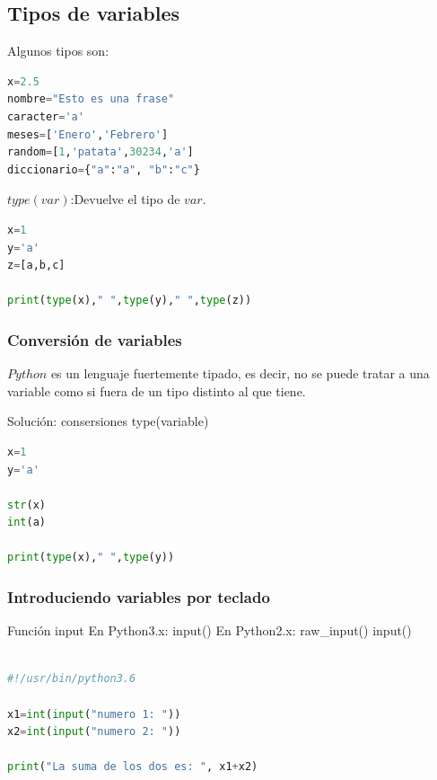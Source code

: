 \documentclass{beamer}
\begin{document}
\subsection{Tipos de variables}
\begin{frame}[fragile]
\begin{exampleblock}{}
Algunos tipos son:
\end{exampleblock}
\begin{lstlisting}[language=Python]
x=2.5
nombre="Esto es una frase"
caracter='a'
meses=['Enero','Febrero']
random=[1,'patata',30234,'a']
diccionario={"a":"a", "b":"c"}
\end{lstlisting}
\pause
\begin{exampleblock}{}
$type(var)$:Devuelve el tipo de $var$.
\end{exampleblock}

\begin{lstlisting}[language=Python]
x=1
y='a'
z=[a,b,c]

print(type(x)," ",type(y)," ",type(z))
\end{lstlisting}
\end{frame}

\begin{frame}[fragile]
\frametitle{Conversión de variables}
\begin{block}{}
$Python$ es un lenguaje fuertemente tipado, es decir, no se puede tratar a una variable como si fuera de un  tipo distinto al que tiene.
\end{block}
\pause
\begin{block}{Solución: consersiones}
type(variable)
\end{block}
\begin{lstlisting}[language=Python]
x=1
y='a'

str(x)
int(a)

print(type(x)," ",type(y))
\end{lstlisting}
\end{frame}

\begin{frame}[fragile]
\frametitle{Introduciendo variables por teclado}
\begin{block}{Función input}
En Python3.x: input()
En Python2.x: raw\_input() input()
\end{block}
\begin{lstlisting}[language=Python]

#!/usr/bin/python3.6

x1=int(input("numero 1: "))
x2=int(input("numero 2: "))

print("La suma de los dos es: ", x1+x2)
\end{lstlisting}
\end{frame}
\end{document}
